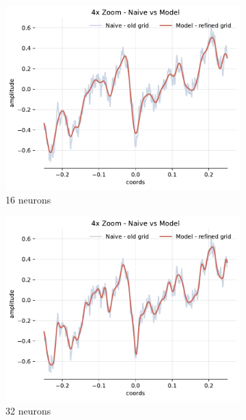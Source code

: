 \begin{figure}[!h]
    \begin{subfigure}[b]{0.32\textwidth}
        \centering
        \includegraphics[width=\textwidth]{img/ch3/4x-zoom-noise-1hl-16hf-w8.pdf}
        \caption{16 neurons}
        \label{fig:4x-zoom-noise-1hl-16hf-w8}
    \end{subfigure}
    \begin{subfigure}[b]{0.32\textwidth}
        \centering
        \includegraphics[width=\textwidth]{img/ch3/4x-zoom-noise-1hl-32hf-w8.pdf}
        \caption{32 neurons}
        \label{fig:comp-4x-zoom-noise-1hl-32hf-w8}
    \end{subfigure}
    \begin{subfigure}[b]{0.32\textwidth}

\end{subfigure}
\end{figure}
